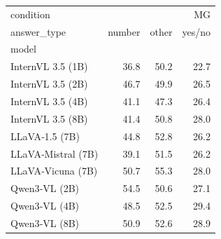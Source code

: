 \begin{tabular}{lrrr}
\toprule
condition & \multicolumn{3}{r}{MG} \\
answer_type & number & other & yes/no \\
model &  &  &  \\
\midrule
InternVL 3.5 (1B) & 36.8 & 50.2 & 22.7 \\
InternVL 3.5 (2B) & 46.7 & 49.9 & 26.5 \\
InternVL 3.5 (4B) & 41.1 & 47.3 & 26.4 \\
InternVL 3.5 (8B) & 41.4 & 50.8 & 28.0 \\
LLaVA‑1.5 (7B) & 44.8 & 52.8 & 26.2 \\
LLaVA‑Mistral (7B) & 39.1 & 51.5 & 26.2 \\
LLaVA‑Vicuna (7B) & 50.7 & 55.3 & 28.0 \\
Qwen3‑VL (2B) & 54.5 & 50.6 & 27.1 \\
Qwen3‑VL (4B) & 48.5 & 52.5 & 29.4 \\
Qwen3‑VL (8B) & 50.9 & 52.6 & 28.9 \\
\bottomrule
\end{tabular}
